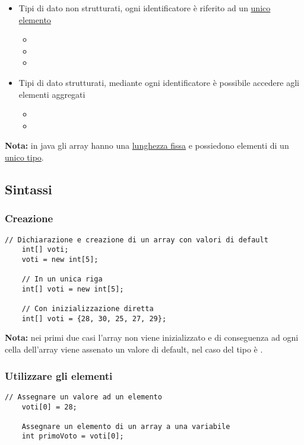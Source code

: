 \documentclass[../main.tex]{subfiles}
\begin{document}
\begin{itemize}
    \item Tipi di dato non strutturati, ogni identificatore è riferito ad un \underline{unico elemento}
    \begin{itemize}
        \item {}
        \item {}
        \item {}
    \end{itemize}
    \item Tipi di dato strutturati, mediante ogni identificatore è possibile accedere agli elementi aggregati
    \begin{itemize}
        \item {}
        \item {}
    \end{itemize}
\end{itemize}
\textbf{Nota:} in java gli array hanno una \underline{lunghezza fissa} e possiedono elementi di un \underline{unico tipo}.

\vspace{0.5cm}
\subsection{Sintassi}
\subsubsection{Creazione}
\begin{lstlisting}[style=java]
    // Dichiarazione e creazione di un array con valori di default
    int[] voti;
    voti = new int[5];

    // In un unica riga
    int[] voti = new int[5];

    // Con inizializzazione diretta
    int[] voti = {28, 30, 25, 27, 29};
\end{lstlisting}
\textbf{Nota:} nei primi due casi l'array non viene inizializzato e di conseguenza ad ogni cella dell'array viene assenato un valore di
default, nel caso del tipo  è .

\vspace{0.5cm}
\subsubsection{Utilizzare gli elementi}
\begin{lstlisting}[style=java]
    // Assegnare un valore ad un elemento
    voti[0] = 28;

    Assegnare un elemento di un array a una variabile
    int primoVoto = voti[0];
\end{lstlisting}
\end{document}
